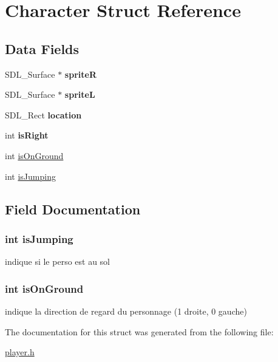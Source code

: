 \hypertarget{struct_character}{\section{Character Struct Reference}
\label{struct_character}
}
\subsection*{Data Fields}
\begin{DoxyCompactItemize}
\item 
\hypertarget{struct_character_a4186e172249b67c908a4439f239c1de9}{S\-D\-L\-\_\-\-Surface $\ast$ {\bfseries sprite\-R}}\label{struct_character_a4186e172249b67c908a4439f239c1de9}

\item 
\hypertarget{struct_character_a73edf76e7b33bc324df0c1a576bf20ab}{S\-D\-L\-\_\-\-Surface $\ast$ {\bfseries sprite\-L}}\label{struct_character_a73edf76e7b33bc324df0c1a576bf20ab}

\item 
\hypertarget{struct_character_a08e7ab1c2395b84bea7ca13eb99bac60}{S\-D\-L\-\_\-\-Rect {\bfseries location}}\label{struct_character_a08e7ab1c2395b84bea7ca13eb99bac60}

\item 
\hypertarget{struct_character_ac73a92163fd55152d03d0aaca5093b72}{int {\bfseries is\-Right}}\label{struct_character_ac73a92163fd55152d03d0aaca5093b72}

\item 
int \hyperlink{struct_character_aa4061d19d285d0ef281f333dee8f9a00}{is\-On\-Ground}
\item 
int \hyperlink{struct_character_a6a61db42178df20e0afd7a5b65412735}{is\-Jumping}
\end{DoxyCompactItemize}


\subsection{Field Documentation}
\hypertarget{struct_character_a6a61db42178df20e0afd7a5b65412735}{
\subsubsection[{is\-Jumping}]{\setlength{\rightskip}{0pt plus 5cm}int is\-Jumping}}\label{struct_character_a6a61db42178df20e0afd7a5b65412735}
indique si le perso est au sol \hypertarget{struct_character_aa4061d19d285d0ef281f333dee8f9a00}{
\subsubsection[{is\-On\-Ground}]{\setlength{\rightskip}{0pt plus 5cm}int is\-On\-Ground}}\label{struct_character_aa4061d19d285d0ef281f333dee8f9a00}
indique la direction de regard du personnage (1 droite, 0 gauche) 

The documentation for this struct was generated from the following file\-:\begin{DoxyCompactItemize}
\item 
\hyperlink{player_8h}{player.\-h}\end{DoxyCompactItemize}
